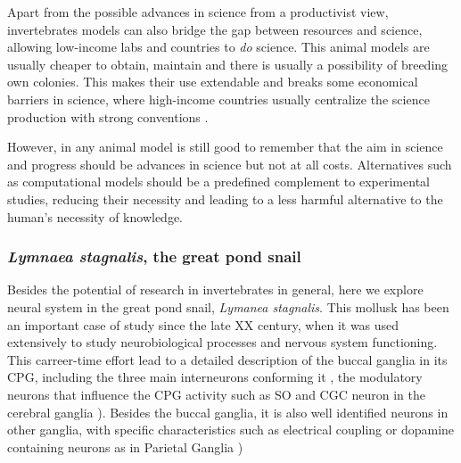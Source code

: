 Apart from the possible advances in science from a productivist view, invertebrates models can also bridge the gap between resources and science, allowing low-income labs and countries to \textit{do} science. This animal models are usually cheaper to obtain, maintain and there is usually a possibility of breeding own colonies. This makes their use extendable and breaks some economical barriers in science, where high-income countries usually centralize the science production with strong conventions \parencite{castillo_spineless_2017,stephan_how_2015}. 


However, in any animal model is still good to remember that the aim in science and progress should be advances in science but not at all costs. Alternatives such as computational models should be a predefined complement to experimental studies, reducing their necessity and leading to a less harmful alternative to the human's necessity of knowledge. 


\subsubsection{\textit{Lymnaea stagnalis}, the great pond snail}
Besides the potential of research in invertebrates in general, here we explore neural system in the great pond snail, \textit{Lymanea stagnalis}. This mollusk has been an important case of study since the late XX century, when it was used extensively to study neurobiological processes and nervous system functioning. This carreer-time effort lead to a detailed description of the buccal ganglia 
in its CPG, including the three main interneurons conforming it \parencite{benjamin_snail_1989,benjamin_morphology_1979,rose_relationship_1979,brierley_behavioral_1997}, the modulatory neurons that influence the CPG activity such as SO and CGC neuron in the cerebral ganglia \parencite{rose_interneuronal_1981,mccrohan_patterns_1980,kemenes_multiple_2001}). Besides the buccal ganglia, it is also well identified neurons in other ganglia, with specific characteristics such as electrical coupling or dopamine containing neurons as in Parietal Ganglia \parencite{benjamin_electrotonic_1986,winlow_multiple_1981})

